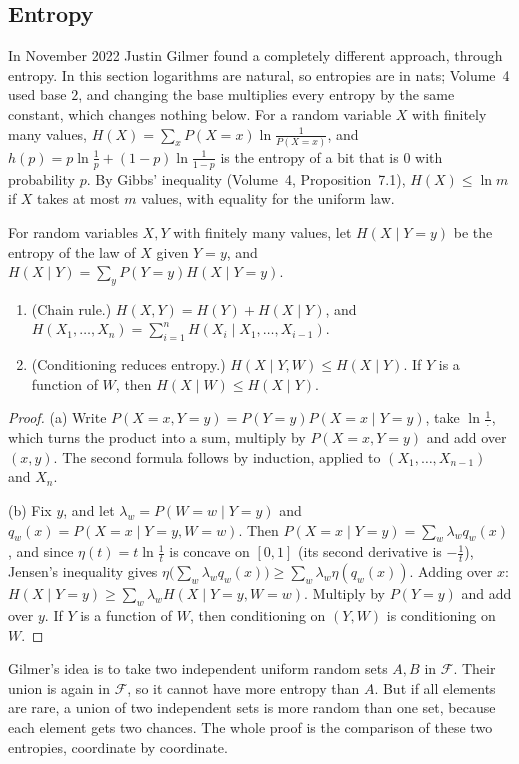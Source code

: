 \subsection{Entropy}

In November 2022 Justin Gilmer found a completely different approach, through entropy. In this section logarithms are natural, so entropies are in
nats; Volume~4 used base $2$, and changing the base multiplies every entropy by the same constant, which changes nothing below. For a random variable $X$
with finitely many values, $H(X)=\sum_xP(X=x)\ln\frac1{P(X=x)}$, and $h(p)=p\ln\frac1p+(1-p)\ln\frac1{1-p}$ is the entropy of a bit that is $0$ with
probability $p$. By Gibbs' inequality (Volume~4, Proposition~7.1), $H(X)\le\ln m$ if $X$ takes at most $m$ values, with equality for the uniform law.

For random variables $X,Y$ with finitely many values, let $H(X\mid Y=y)$ be the entropy of the law of $X$ given $Y=y$, and
$H(X\mid Y)=\sum_yP(Y=y)H(X\mid Y=y)$.

\begin{lemma}\label{conjectures:lem:condent}
\begin{enumerate}[label=(\alph*)]
\item (Chain rule.) $H(X,Y)=H(Y)+H(X\mid Y)$, and $H(X_1,\dots,X_n)=\sum_{i=1}^nH(X_i\mid X_1,\dots,X_{i-1})$.
\item (Conditioning reduces entropy.) $H(X\mid Y,W)\le H(X\mid Y)$. If $Y$ is a function of $W$, then $H(X\mid W)\le H(X\mid Y)$.
\end{enumerate}
\end{lemma}
\begin{proof}
(a) Write $P(X=x,Y=y)=P(Y=y)P(X=x\mid Y=y)$, take $\ln\frac1{\,\cdot\,}$, which turns the product into a sum, multiply by $P(X=x,Y=y)$ and add over
$(x,y)$. The second formula follows by induction, applied to $(X_1,\dots,X_{n-1})$ and $X_n$.

(b) Fix $y$, and let $\lambda_w=P(W=w\mid Y=y)$ and $q_w(x)=P(X=x\mid Y=y,W=w)$. Then $P(X=x\mid Y=y)=\sum_w\lambda_wq_w(x)$, and since
$\eta(t)=t\ln\frac1t$ is concave on $[0,1]$ (its second derivative is $-\frac1t$), Jensen's inequality gives
$\eta\bigl(\sum_w\lambda_wq_w(x)\bigr)\ge\sum_w\lambda_w\eta(q_w(x))$. Adding over $x$: $H(X\mid Y=y)\ge\sum_w\lambda_wH(X\mid Y=y,W=w)$. Multiply by
$P(Y=y)$ and add over $y$. If $Y$ is a function of $W$, then conditioning on $(Y,W)$ is conditioning on $W$.
\end{proof}

Gilmer's idea is to take two independent uniform random sets $A,B$ in $\mathcal F$. Their union is again in $\mathcal F$, so it cannot have more entropy
than $A$. But if all elements are rare, a union of two independent sets is more random than one set, because each element gets two chances. The whole
proof is the comparison of these two entropies, coordinate by coordinate.

